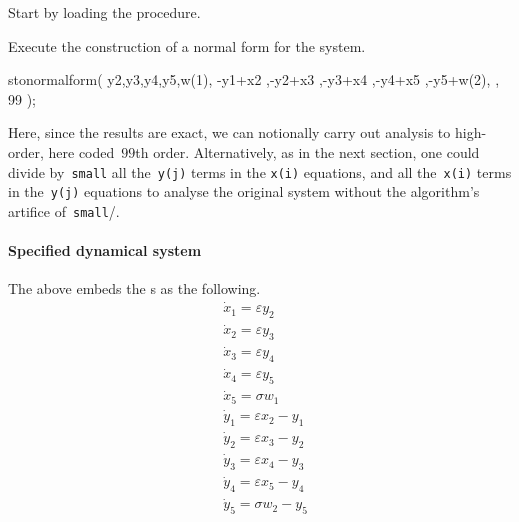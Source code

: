 Start by loading the procedure.
Execute the construction of a normal form for the system.
\begin{reduce}
stonormalform(
    {y2,y3,y4,y5,w(1)},
    {-y1+x2
    ,-y2+x3
    ,-y3+x4
    ,-y4+x5
    ,-y5+w(2)},
    { },
    99 );
\end{reduce}
Here, since the results are exact, we can notionally carry out analysis to high-order, here coded~\(99\)th order.  Alternatively, as in the next section, one could divide by~\verb|small| all the~\verb|y(j)| terms in the \verb|x(i)| equations, and all the~\verb|x(i)| terms in the~\verb|y(j)| equations to analyse the original system without the algorithm's artifice of~\verb|small|/\eps.

\paragraph{Specified dynamical system}
The above embeds the \ode{}s as the following. 
\begin{align*}&
\dot x_{1}=\varepsilon  y_{2}
\\& 
\dot x_{2}=\varepsilon  y_{3}
\\& 
\dot x_{3}=\varepsilon  y_{4}
\\& 
\dot x_{4}=\varepsilon  y_{5}
\\& 
\dot x_{5}=\sigma  w_{1}
\\& 
\dot y_{1}=\varepsilon  x_{2}-y_{1}
\\& 
\dot y_{2}=\varepsilon  x_{3}-y_{2}
\\& 
\dot y_{3}=\varepsilon  x_{4}-y_{3}
\\& 
\dot y_{4}=\varepsilon  x_{5}-y_{4}
\\& 
\dot y_{5}=\sigma  w_{2}-y_{5}
\end{align*}

